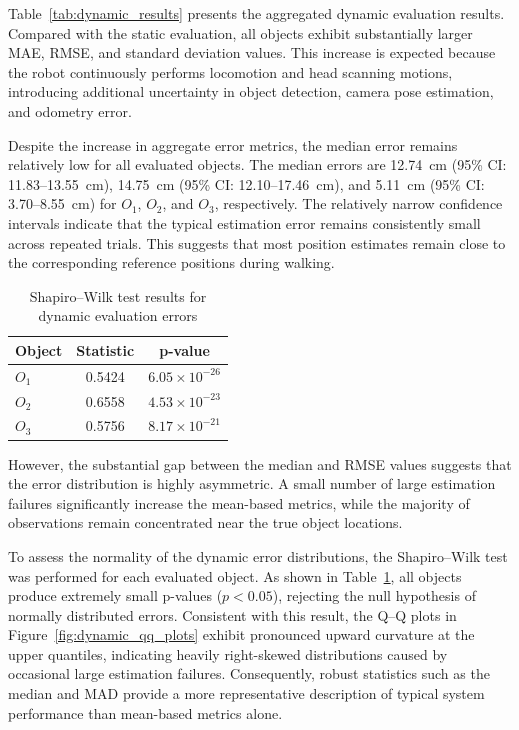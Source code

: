 \documentclass[journal]{IAENGtran}
\begin{document}
Table~\ref{tab:dynamic_results} presents the aggregated dynamic evaluation
results. Compared with the static evaluation, all objects exhibit substantially
larger MAE, RMSE, and standard deviation values. This increase is expected because
the robot continuously performs locomotion and head scanning motions, introducing
additional uncertainty in object detection, camera pose estimation, and odometry error.

Despite the increase in aggregate error metrics, the median error remains
relatively low for all evaluated objects. The median errors are
12.74~cm (95\% CI: 11.83--13.55~cm), 14.75~cm (95\% CI: 12.10--17.46~cm),
and 5.11~cm (95\% CI: 3.70--8.55~cm) for $O_1$, $O_2$, and $O_3$,
respectively. The relatively narrow confidence intervals indicate that
the typical estimation error remains consistently small across repeated
trials. This suggests that most position estimates remain close to the
corresponding reference positions during walking.

\begin{table}[!h]
\centering
\footnotesize
\caption{Shapiro--Wilk test results for dynamic evaluation errors}
\label{shapiro_wilk_test}
\begin{tabular}{lcc}
\toprule
\textbf{Object} & \textbf{Statistic} & \textbf{p-value} \\
\midrule
$O_1$ & 0.5424 & $6.05 \times 10^{-26}$ \\
$O_2$ & 0.6558 & $4.53 \times 10^{-23}$ \\
$O_3$ & 0.5756 & $8.17 \times 10^{-21}$ \\
\bottomrule
\end{tabular}
\end{table}

However, the substantial gap between the median and RMSE values suggests
that the error distribution is highly asymmetric. A small number of
large estimation failures significantly increase the mean-based metrics,
while the majority of observations remain concentrated near the true
object locations.

To assess the normality of the dynamic error distributions, the
Shapiro--Wilk test was performed for each evaluated object. As shown in
Table~\ref{shapiro_wilk_test}, all objects produce extremely small
p-values ($p < 0.05$), rejecting the null hypothesis of normally
distributed errors. Consistent with this result, the Q--Q plots in
Figure~\ref{fig:dynamic_qq_plots} exhibit pronounced upward curvature
at the upper quantiles, indicating heavily right-skewed distributions
caused by occasional large estimation failures. Consequently, robust
statistics such as the median and MAD provide a more representative
description of typical system performance than mean-based metrics alone.
\end{document}

